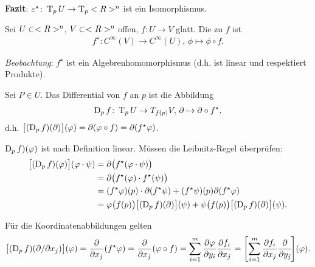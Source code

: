 \textbf{Fazit}: $\varepsilon^\star\colon\operatorname{T}_p U\to \operatorname{T}_p<R>^n$ ist ein Isomorphismus.

\begin{definition}
	Sei $U\subset<R>^n$, $V\subset<R>^n$ offen, $f\colon U\to V$ glatt. Die  zu $f$ ist \begin{align*}
		f^\star\colon C^\infty(V)\to C^\infty(U),\,\phi\mapsto\phi\circ f.
	\end{align*}
\end{definition}
\emph{Beobachtung}: $f^\star$ ist ein Algebrenhomomorphismus (d.h. ist linear und respektiert Produkte).

\begin{definition}
	Sei $P\in U$. Das Differential von $f$ an $p$ ist die Abbildung \begin{align*}
		\operatorname{D}_p f\colon \operatorname{T}_p U\to T_{f(p)} V,\,\partial\mapsto \partial\circ f^\star,
	\end{align*}
	d.h. $\big[ (\operatorname{D}_p f)(\partial)\big](\varphi) = \partial(\varphi\circ f) = \partial(f^\star \varphi)$.
\end{definition}
$\operatorname{D}_p f)(\varphi)$ ist nach Definition linear. Müssen die Leibnitz-Regel überprüfen:\begin{align*}
	\big[(\operatorname{D}_p f)(\varphi)\big](\varphi\cdot\psi) &= \partial\big(f^\star(\varphi\cdot\psi)\big) \\
	&= \partial\big(f^\star(\varphi)\cdot f^\star(\psi)\big) \\
	&= (f^\star \varphi)(p) \cdot \partial(f^\star \psi) + (f^\star\psi)(p)\partial(f^\star \varphi) \\
	&= \varphi\big(f(p)\big) \big[ (\operatorname{D}_p f)(\partial)\big](\psi) + \psi\big( f(p)\big) \big[ (\operatorname{D}_p f)(\partial)\big](\psi).
\end{align*}

Für die Koordinatenabbildungen gelten \begin{align*}
	\big[ (\operatorname{D}_p f) (\partial\slash\partial x_j)\big](\varphi) = \frac{\partial}{\partial x_j}(f^\star \varphi) = \frac{\partial}{\partial x_j}(\varphi\circ f) = \sum_{i=1}^m \frac{\partial \varphi}{\partial y_i}\frac{\partial f_i}{\partial x_j} = \Bigg[\! \sum_{i=1}^m \frac{\partial f_i}{\partial x_j}\frac{\partial}{\partial y_j}\!\Bigg](\varphi).
\end{align*}

